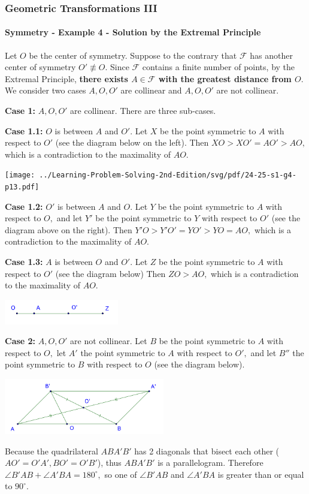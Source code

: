\documentclass[8pt,xcolor=table,dvipsnames]{beamer}
\newcommand{\dg}{^\circ}
\begin{document}
\begin{frame}[t]
    \frametitle{Geometric Transformations III}
    \framesubtitle{Symmetry - Example 4 - Solution by the Extremal Principle}
    \begin{overprint}
        Let $O$ be the center of symmetry. Suppose to the contrary that $\mathcal{F}$ has another center of symmetry $O' \not \equiv O.$
        Since $\mathcal{F}$ contains a finite number of points, by the Extremal Principle,
        \textbf{there exists $A \in \mathcal{F}$ with the greatest distance from $O$}.
        We consider two cases $A, O, O'$ are collinear and $A, O, O'$ are not collinear.

        \textbf{Case 1:} $A, O, O'$ are collinear. There are three sub-cases.

        \textbf{Case 1.1:} $O$ is between $A$ and $O'.$ Let $X$ be the point symmetric to $A$ with respect to $O'$
        (see the diagram below on the left).
        Then $XO > XO' = AO' > AO,$ which is a contradiction to the maximality of $AO.$
        \begin{center}
            \texttt{[image: ../Learning-Problem-Solving-2nd-Edition/svg/pdf/24-25-s1-g4-p13.pdf]}
        \end{center}
        \textbf{Case 1.2:} $O'$ is between $A$ and $O.$ Let $Y$ be the point symmetric to $A$ with respect to $O,$
        and let $Y'$ be the point symmetric to $Y$ with respect to $O'$ (see the diagram above on the right).
        Then $Y'O > Y'O' = YO' > YO = AO,$ which is a contradiction to the maximality of $AO.$

        \textbf{Case 1.3:} $A$ is between $O$ and $O'.$ Let $Z$ be the point symmetric to $A$ with respect to $O'$
        (see the diagram below) Then $ZO > AO,$ which is a contradiction to the maximality of $AO.$
        \begin{center}
            \includegraphics[width=5cm]{./svg/pdf/24-25-s1-g4-p13-2.pdf}
        \end{center}
        \textbf{Case 2:} $A, O, O'$ are not collinear.
        Let $B$ be the point symmetric to $A$ with respect to $O,$ let $A'$ the point symmetric to $A$ with respect to $O',$
        and let $B''$ the point symmetric to $B$ with respect to $O$ (see the diagram below).
        \begin{center}
            \includegraphics[width=7cm]{./svg/pdf/24-25-s1-g4-p13-3.pdf}
        \end{center}
        Because the quadrilateral $ABA'B'$ has 2 diagonals that bisect each other ($AO'=O'A', BO'=O'B'$), thus $ABA'B'$ is a parallelogram.
        Therefore $\angle B'AB + \angle A'BA = 180\dg,$ so one of $\angle B'AB$ and $\angle A'BA$ is greater than or equal to $90\dg.$
    

\end{overprint}
\end{frame}
\end{document}
